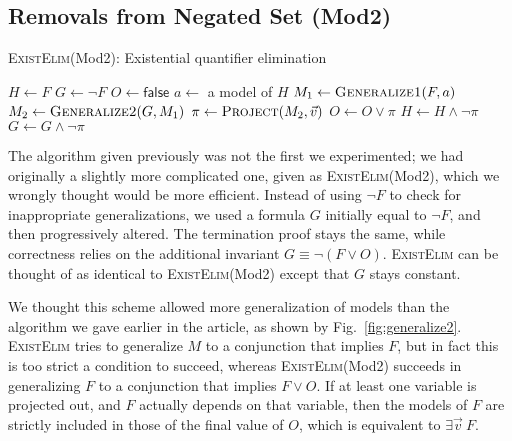 \subsection{Removals from Negated Set  (Mod2)}
\begin{algorithm}
\caption{\textsc{ExistElim}(Mod2): Existential quantifier elimination}
\small
\begin{algorithmic}
\STATE $H \gets F$
\STATE $G \gets \neg F$
\STATE $O \gets \textsf{false}$
  \STATE $a \gets$ a model of $H$ 
  \STATE $M_1 \gets \textsc{Generalize1}(F, a)$ 
  \STATE $M_2 \gets \textsc{Generalize2}(G, M_1)$ 
  \STATE $\pi \gets \textsc{Project}(M_2, \vec{v})$
  \STATE $O \gets O \vee \pi$
  \STATE $H \gets H \wedge \neg \pi$
  \STATE $G \gets G \wedge \neg \pi$
\ENDWHILE
{}
\end{algorithmic}
\end{algorithm}

\label{part:algo-mod2}
The algorithm given previously was not the first we experimented; we had originally a slightly more complicated one, given as \textsc{ExistElim}(Mod2), which we wrongly thought would be more efficient. Instead of using $\neg F$ to check for inappropriate generalizations, we used a formula $G$ initially equal to $\neg F$, and then progressively altered. The termination proof stays the same, while correctness relies on the additional invariant $G \equiv \neg(F \vee O)$. \textsc{ExistElim} can be thought of as identical to  \textsc{ExistElim}(Mod2) except that $G$ stays constant.

We thought this scheme allowed more generalization of models than the algorithm we gave earlier in the article, as shown by Fig.~\ref{fig:generalize2}. \textsc{ExistElim} tries to generalize $M$ to a conjunction that implies $F$, but in fact this is too strict a condition to succeed, whereas \textsc{ExistElim}(Mod2) succeeds in generalizing $F$ to a conjunction that implies $F \vee O$. If at least one variable is projected out, and $F$ actually depends on that variable, then the models of $F$ are strictly included in those of the final value of $O$, which is equivalent to $\exists \vec{v}~F$.

